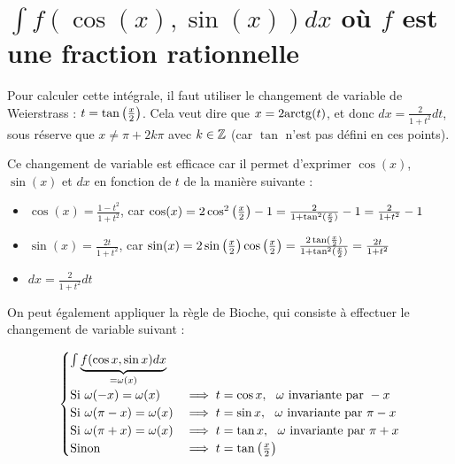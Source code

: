 \documentclass[12pt, a4paper]{report}
\begin{document}
\section{$\int f(\cos(x), \sin(x)) dx$ où $f$ est une fraction rationnelle}

Pour calculer cette intégrale, il faut utiliser le changement de variable de Weierstrass : $t = \tan\left(\frac{x}{2}\right)$. Cela veut dire que $x=2\mathrm{arctg}(t)$, et donc $dx = \frac{2}{1+t^2} dt$, sous réserve que $x \ne \pi + 2k\pi$ avec $k\in\mathbb{Z}$ (car $\tan$ n'est pas défini en ces points).

Ce changement de variable est efficace car il permet d'exprimer $\cos(x)$, $\sin(x)$ et $dx$ en fonction de $t$ de la manière suivante :
\begin{itemize}
    \item $\cos(x) = \frac{1 - t^2}{1 + t^2}$, car $\cos(x) = 2\cos^2\left(\frac{x}{2}\right) - 1=\frac{2}{1+\tan^2(\frac x{2})}-1=\frac{2}{1+t^2}-1$
    \item $\sin(x) = \frac{2t}{1 + t^2}$, car $\sin(x) = 2\sin\left(\frac{x}{2}\right)\cos\left(\frac{x}{2}\right)=\frac{2\tan(\frac x{2})}{1+\tan^2(\frac x{2})}=\frac{2t}{1+t^2}$
    \item $dx = \frac{2}{1 + t^2} dt$
\end{itemize}

\begin{remark}
    On peut également appliquer la règle de Bioche, qui consiste à effectuer le changement de variable suivant :

    $$\begin{cases}
    \int \underbrace{f(\cos x, \sin x) dx}_{=\omega(x)}\\
    \text{Si } \omega(-x) = \omega(x) &\implies t = \cos x,~~\omega \text{ invariante par } -x\\
    \text{Si } \omega(\pi - x) = \omega(x) &\implies t = \sin x,~~\omega \text{ invariante par } \pi-x\\
    \text{Si } \omega(\pi + x) = \omega(x) &\implies t = \tan x,~~\omega \text{ invariante par } \pi+x\\
    \text{Sinon} &\implies t = \tan\left(\frac{x}{2}\right)
    \end{cases}$$
\end{remark}
\end{document}
